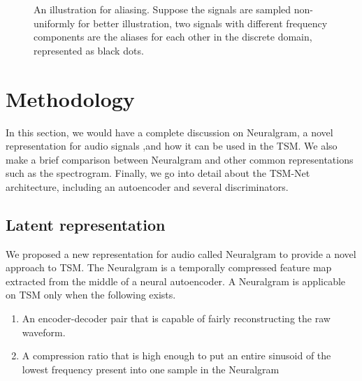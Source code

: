\documentclass[12pt]{article}
\begin{document}
\begin{figure}
\begin{center}


\end{center}
\caption{An illustration for aliasing. Suppose the signals are sampled non-uniformly for better illustration, two signals with different frequency components are the aliases for each other in the discrete domain, represented as black dots.}
\label{fig:3}
\end{figure}

\section{Methodology}
In this section, we would have a complete discussion on Neuralgram, a novel representation for audio signals ,and how it can be used in the TSM. We also make a brief comparison between Neuralgram and other common representations such as the spectrogram. Finally, we go into detail about the TSM-Net architecture, including an autoencoder and several discriminators.

\subsection{Latent representation}
We proposed a new representation for audio called Neuralgram to provide a novel approach to TSM. The Neuralgram is a temporally compressed feature map extracted from the middle of a neural autoencoder. A Neuralgram is applicable on TSM only when the following exists.
\begin{enumerate}
  \item{An encoder-decoder pair that is capable of fairly reconstructing the raw waveform.}
  \item{A compression ratio that is high enough to put an entire sinusoid of the lowest frequency present into one sample in the Neuralgram}
\end{enumerate}
\end{document}
